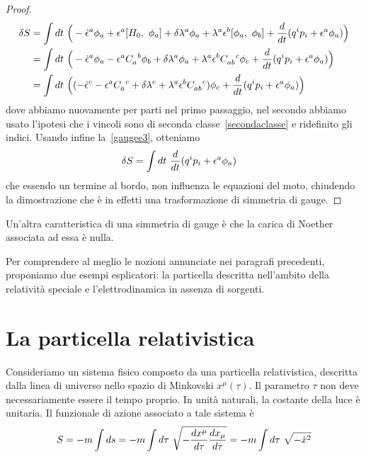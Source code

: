 \begin{proof}
    \begin{equation*}
    \begin{aligned}
        \delta S & = \int dt ~ \Big (- \dot \epsilon^a \phi_a + \epsilon^a \poi{H_0}{\phi_a} + \delta \lambda^a \phi_a + \lambda^a \epsilon^b \poi{\phi_a}{\phi_b} + \dv{}{t} (q^i p_i + \epsilon^a \phi_a) \Big ) \\ & = \int dt ~ \Big (- \dot \epsilon^a \phi_a - \epsilon^a  C_a^{\phantom a b} \phi_b + \delta \lambda^a \phi_a + \lambda^a \epsilon^b C_{ab}^{\phantom{ab} c} \phi_c + \dv{}{t} (q^i p_i + \epsilon^a \phi_a) \Big ) \\ & = \int dt ~ \Big ((- \dot \epsilon^c - \epsilon^a  C_a^{\phantom a c} + \delta \lambda^c + \lambda^a \epsilon^b C_{ab}^{\phantom{ab} c} )\phi_c + \dv{}{t} (q^i p_i + \epsilon^a \phi_a) \Big ) 
    \end{aligned}
    \end{equation*}
    dove abbiamo nuovamente per parti nel primo passaggio, nel secondo abbiamo usato l'ipotesi che i vincoli sono di seconda classe~\eqref{secondaclasse} e ridefinito gli indici. Usando infine la~\eqref{gaugee3}, otteniamo
    \begin{equation}
    \begin{aligned}
       \delta S & = \int dt ~ \frac{d}{dt} (q^i p_i + \epsilon^a \phi_a)
    \end{aligned}
    \end{equation}
    che essendo un termine al bordo, non influenza le equazioni del moto, chiudendo la dimostrazione che è in effetti una trasformazione di simmetria di gauge.
    \end{proof}

    Un'altra caratteristica di una simmetria di gauge è che la carica di Noether associata ad essa è nulla.

    \hfill

    Per comprendere al meglio le nozioni annunciate nei paragrafi precedenti, proponiamo due esempi esplicatori: la particella descritta nell'ambito della relatività speciale e l'elettrodinamica in assenza di sorgenti. 

\section{La particella relativistica}

    Consideriamo un sistema fisico composto da una particella relativistica, descritta dalla linea di universo nello spazio di Minkovski $x^\mu(\tau)$. Il parametro $\tau$ non deve necessariamente essere il tempo proprio. In unità naturali, la costante della luce è unitaria. Il funzionale di azione associato a tale sistema è
    \begin{equation} \label{azionerel}
        S = - m \int ds = - m \int d\tau ~ \sqrt{- \frac{dx^\mu}{d\tau}\frac{dx_\mu}{d\tau}} = - m \int d\tau ~ \sqrt{- \dot x^2}
    \end{equation}
    
